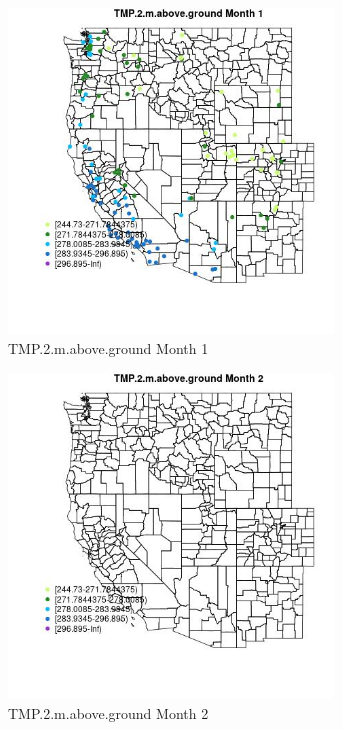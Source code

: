 \begin{figure} 
\centering  
\includegraphics[width=0.77\textwidth]{Code_Outputs/Report_ML_input_PM25_Step4_part_e_de_duplicated_aveswNAs_MapObsMo1TMP2maboveground.jpg} 
\caption{\label{fig:Report_ML_input_PM25_Step4_part_e_de_duplicated_aveswNAsMapObsMo1TMP2maboveground}TMP.2.m.above.ground Month 1} 
\end{figure} 
 

\begin{figure} 
\centering  
\includegraphics[width=0.77\textwidth]{Code_Outputs/Report_ML_input_PM25_Step4_part_e_de_duplicated_aveswNAs_MapObsMo2TMP2maboveground.jpg} 
\caption{\label{fig:Report_ML_input_PM25_Step4_part_e_de_duplicated_aveswNAsMapObsMo2TMP2maboveground}TMP.2.m.above.ground Month 2} 
\end{figure} 
 

